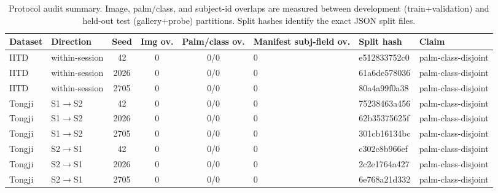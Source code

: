 \begin{table}[t]
\centering
\caption{Protocol audit summary. Image, palm/class, and subject-id overlaps are measured between development (train+validation) and held-out test (gallery+probe) partitions. Split hashes identify the exact JSON split files.}
\label{tab:protocol_audit}
\footnotesize
\setlength{\tabcolsep}{3pt}
\begin{tabular}{llccclll}
\toprule
Dataset & Direction & Seed & Img ov. & Palm/class ov. & Manifest subj-field ov. & Split hash & Claim \\
\midrule
IITD & within-session & 42 & 0 & 0/0 & 0 & e512833752c0 & palm-class-disjoint \\
IITD & within-session & 2026 & 0 & 0/0 & 0 & 61a6de578036 & palm-class-disjoint \\
IITD & within-session & 2705 & 0 & 0/0 & 0 & 80a4a99f0a38 & palm-class-disjoint \\
Tongji & S1$\to$S2 & 42 & 0 & 0/0 & 0 & 75238463a456 & palm-class-disjoint \\
Tongji & S1$\to$S2 & 2026 & 0 & 0/0 & 0 & 62b35375625f & palm-class-disjoint \\
Tongji & S1$\to$S2 & 2705 & 0 & 0/0 & 0 & 301cb16134bc & palm-class-disjoint \\
Tongji & S2$\to$S1 & 42 & 0 & 0/0 & 0 & c302c8b966ef & palm-class-disjoint \\
Tongji & S2$\to$S1 & 2026 & 0 & 0/0 & 0 & 2c2e1764a427 & palm-class-disjoint \\
Tongji & S2$\to$S1 & 2705 & 0 & 0/0 & 0 & 6e768a21d332 & palm-class-disjoint \\
\bottomrule
\end{tabular}
\end{table}
